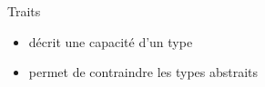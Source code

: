 \begin{frame}[fragile]{Traits}
\protect\hypertarget{traits}{}
\begin{Shaded}
\begin{Highlighting}[]
  \OperatorTok{\{}
    \OperatorTok{\&}\OperatorTok{,}\OperatorTok{:} \OperatorTok{\&}\NormalTok{) }\OperatorTok{{-}\textgreater{}} \OperatorTok{;}
    \OperatorTok{\&}\OperatorTok{,}\OperatorTok{:} \OperatorTok{\&}\NormalTok{) }\OperatorTok{{-}\textgreater{}}  \OperatorTok{\{}
        \OperatorTok{!}
    \OperatorTok{\}}
\OperatorTok{\}}
\OperatorTok{\textless{}}\OperatorTok{:} \OperatorTok{\textgreater{}}\OperatorTok{:} \OperatorTok{\&}\NormalTok{[T]}\OperatorTok{,}\OperatorTok{:} \OperatorTok{\&}\OperatorTok{{-}\textgreater{}}  \OperatorTok{\{}
     \OperatorTok{=} \OperatorTok{;}
    \OperatorTok{\{}
        \OperatorTok{==}\OperatorTok{\{}
\OperatorTok{+=} \OperatorTok{;}
        \OperatorTok{\}}
    \OperatorTok{\}}
\OperatorTok{\}}
\end{Highlighting}
\end{Shaded}

\begin{itemize}
\tightlist
\item
  décrit une capacité d'un type
\item
  permet de contraindre les types abstraits
\end{itemize}
\end{frame}

